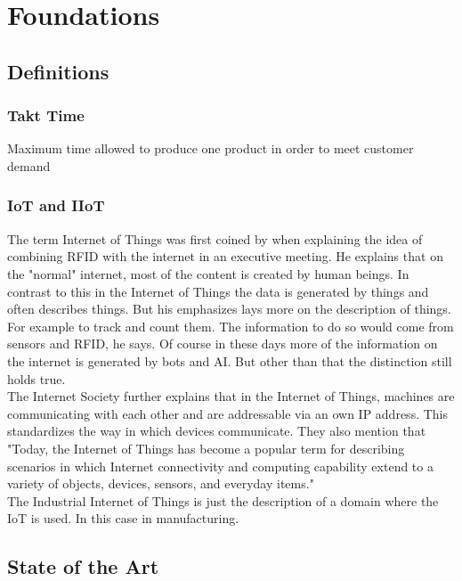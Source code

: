\clearpage
\chapter{\textbf{Foundations}}\label{grundlagen}
\section{Definitions}
\subsection{Takt Time}
Maximum time allowed to produce one product in order to meet customer demand
\subsection{IoT and IIoT}
The term Internet of Things was first coined by \cite{ashtonThatInternetThings} when explaining the idea of combining RFID with the internet in an executive meeting. He explains that on the "normal" internet, most of the content is created by human beings. In contrast to this in the Internet of Things the data is generated by things and often describes things. But his emphasizes lays more on the description of things. For example to track and count them. The information to do so would come from sensors and RFID, he says.
Of course in these days more of the information on the internet is generated by bots and AI. But other than that the distinction still holds true. 
\\The Internet Society \cite{roseInternetThingsOverview} further explains that in the Internet of Things, machines are communicating with each other and are addressable via an own IP address. This standardizes the way in which devices communicate. They also mention that "Today, the Internet of Things has become a popular term for describing scenarios in which  Internet connectivity and computing capability extend to a variety of objects, devices, sensors, and everyday  items."
\\The Industrial Internet of Things is just the description of a domain where the IoT is used. In this case in manufacturing. \cite{WhatIoTInternet}
\section{State of the Art}\label{unterkapitel}
